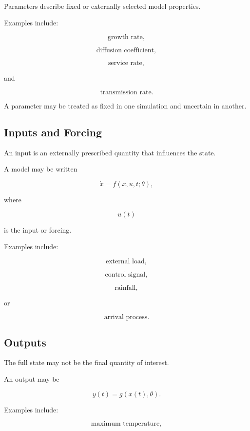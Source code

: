 Parameters describe fixed or externally selected model properties.

Examples include:

\[
\boxed{
\text{growth rate},
}
\]

\[
\boxed{
\text{diffusion coefficient},
}
\]

\[
\boxed{
\text{service rate},
}
\]

and

\[
\boxed{
\text{transmission rate}.
}
\]

A parameter may be treated as fixed in one simulation and uncertain in
another.

\subsection{Inputs and Forcing}
\label{subsec:simulation-inputs}

An input is an externally prescribed quantity that influences the state.

A model may be written

\[
\boxed{
\dot{x}
=
f(x,u,t;\theta),
}
\]

where

\[
u(t)
\]

is the input or forcing.

Examples include:

\[
\boxed{
\text{external load},
}
\]

\[
\boxed{
\text{control signal},
}
\]

\[
\boxed{
\text{rainfall},
}
\]

or

\[
\boxed{
\text{arrival process}.
}
\]

\subsection{Outputs}
\label{subsec:simulation-outputs}

The full state may not be the final quantity of interest.

An output may be

\[
\boxed{
y(t)
=
g(x(t),\theta).
}
\]

Examples include:

\[
\boxed{
\text{maximum temperature},
}
\]

